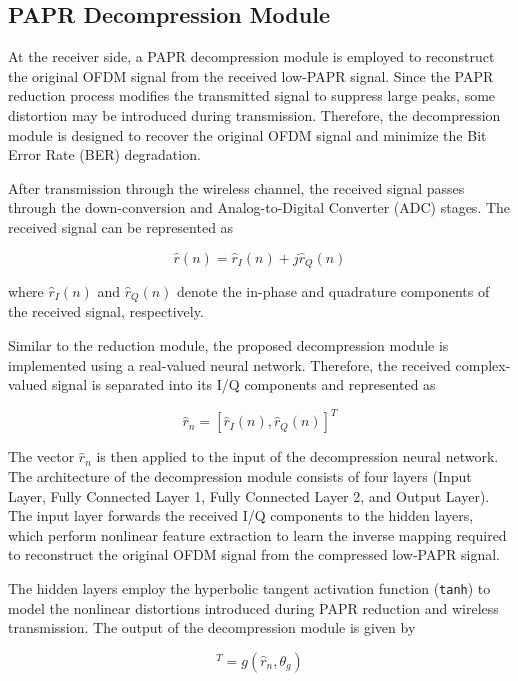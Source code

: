 \subsection{PAPR Decompression Module}

At the receiver side, a PAPR decompression module is employed to reconstruct the original OFDM signal from the received low-PAPR signal. Since the PAPR reduction process modifies the transmitted signal to suppress large peaks, some distortion may be introduced during transmission. Therefore, the decompression module is designed to recover the original OFDM signal and minimize the Bit Error Rate (BER) degradation.

After transmission through the wireless channel, the received signal passes through the down-conversion and Analog-to-Digital Converter (ADC) stages. The received signal can be represented as

\begin{equation*}
    \hat{r}(n)=\hat{r}_I(n)+j\hat{r}_Q(n)
\end{equation*}

where $\hat{r}_I(n)$ and $\hat{r}_Q(n)$ denote the in-phase and quadrature components of the received signal, respectively.

Similar to the reduction module, the proposed decompression module is implemented using a real-valued neural network. Therefore, the received complex-valued signal is separated into its I/Q components and represented as

\begin{equation*}
    \hat{r}_n=[\hat{r}_I(n),\hat{r}_Q(n)]^T
\end{equation*}

The vector $\hat{r}_n$ is then applied to the input of the decompression neural network. The architecture of the decompression module consists of four layers (Input Layer, Fully Connected Layer 1, Fully Connected Layer 2, and Output Layer). The input layer forwards the received I/Q components to the hidden layers, which perform nonlinear feature extraction to learn the inverse mapping required to reconstruct the original OFDM signal from the compressed low-PAPR signal.

The hidden layers employ the hyperbolic tangent activation function (\texttt{tanh}) to model the nonlinear distortions introduced during PAPR reduction and wireless transmission. The output of the decompression module is given by

\begin{equation*}
    [\hat{x}_I(n),\hat{x}_Q(n)]^T=g(\hat{r}_n,\theta_g)
\end{equation*}


